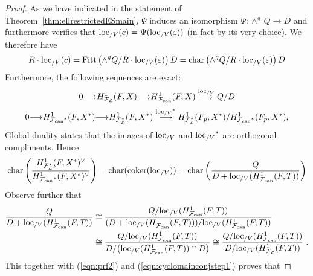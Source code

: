 \documentclass[12pt]{amsart}
\numberwithin{equation}{section}
\begin{document}
\begin{proof}
As we have indicated in the statement of Theorem~\ref{thm:ellrestrictedESmain}, $\Psi$ induces an isomorphism $\Psi:\wedge^g\,Q {\rightarrow} D$ and furthermore verifies that ${\textup{loc}_{/V}}(c)=\Psi({\textup{loc}_{/V}}(\varepsilon))$ (in fact by its very choice). We therefore have
\begin{equation}\label{eqn:prf1}R\cdot{\textup{loc}_{/V}}(c)=\textup{Fitt}\left(\wedge^g Q/R\cdot {\textup{loc}_{/V}}(\varepsilon)\right) D=\textup{char}\left(\wedge^g Q/R\cdot {\textup{loc}_{/V}}(\varepsilon)\right) D\end{equation}
Furthermore, the following sequences are exact:
$$0{\longrightarrow} H^1_{{\mathcal{F}}_{\mathcal{L}}}(F,X) {\longrightarrow} H^1_{\mathcal{F}_{\textup{\lowercase{can}}}}(F,X)\stackrel{\textup{loc}_{/V}}{\longrightarrow} Q/D$$
$$0{\longrightarrow} H^1_{{\mathcal{F}_{\textup{\lowercase{can}}}}^*}(F,X^*) {\longrightarrow} H^1_{{\mathcal{F}}_{\mathcal{L}}^*}(F,X^*)\stackrel{{\textup{loc}_{/V}}^*}{\longrightarrow} H^1_{{\mathcal{F}}_{\mathcal{L}}^*}(F_p,X^*)/H^1_{{\mathcal{F}_{\textup{\lowercase{can}}}}^*}(F_p,X^*),$$
Global duality states that the images of ${\textup{loc}_{/V}}$ and ${\textup{loc}_{/V}}^*$ are orthogonal compliments. Hence
\begin{equation}\label{eqn:prf2} {\textup{char}}\left(\frac{H^1_{{\mathcal{F}}_{\mathcal{L}}^*}(F,X^*)^\vee}{H^1_{{\mathcal{F}_{\textup{\lowercase{can}}}}^*}(F,X^*)^\vee}\right)={\textup{char}}
(\textup{coker}({\textup{loc}_{/V}}))={\textup{char}}\left(\frac{Q}{D+{\textup{loc}_{/V}}(H^1_{\mathcal{F}_{\textup{\lowercase{can}}}}(F,T))}\right)\end{equation}
Observe further that
\begin{align*}\frac{Q}{D+{\textup{loc}_{/V}}(H^1_{\mathcal{F}_{\textup{\lowercase{can}}}}(F,T))}&\cong \frac{{Q}/{{\textup{loc}_{/V}}(H^1_{\mathcal{F}_{\textup{\lowercase{can}}}}(F,T))}}{(D+{\textup{loc}_{/V}}(H^1_{\mathcal{F}_{\textup{\lowercase{can}}}}(F,T)))/{{\textup{loc}_{/V}}(H^1_{\mathcal{F}_{\textup{\lowercase{can}}}}(F,T))}}\\
&\cong \frac{{Q}/{{\textup{loc}_{/V}}(H^1_{\mathcal{F}_{\textup{\lowercase{can}}}}(F,T))}}{D/{\left({\textup{loc}_{/V}}(H^1_{\mathcal{F}_{\textup{\lowercase{can}}}}(F,T))\cap D\right)}}\cong \frac{{Q}/{{\textup{loc}_{/V}}(H^1_{\mathcal{F}_{\textup{\lowercase{can}}}}(F,T))}}{D/{{\textup{loc}_{/V}}(H^1_{{\mathcal{F}}_{\mathcal{L}}}(F,T))}}\,\,.
\end{align*}
This together with (\ref{eqn:prf2}) and (\ref{eqn:cyclomainconjstep1}) proves that

\end{proof}
\end{document}
